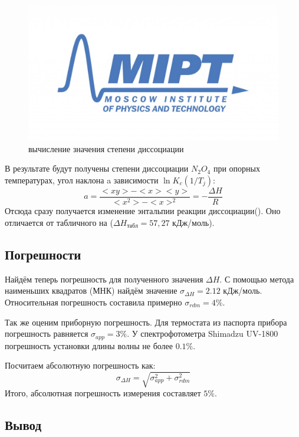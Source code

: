 \documentclass[a4paper,12pt]{article} %
\begin{document}
\begin{figure}[h!]
\begin{center}
\includegraphics[width=1.2\textwidth]{Images/logo.jpg}
\end{center}
\caption{вычисление значения степени диссоциации} \label{dz1}
\end{figure}


В результате будут получены степени диссоциации $N_2O_4$ при опорных температурах, угол наклона a зависимости $\ln K_c(1/T_j)$:
\begin{equation}
a = \frac{ <xy> - <x><y>}{<x^2> - <x>^2} = -\frac{\Delta H}{R}
\end{equation}
Отсюда сразу получается изменение энтальпии реакции диссоциации(). Оно отличается от табличного на ($\Delta H_{табл} = 57,27$ кДж/моль).

\subsection*{Погрешности}

Найдём теперь погрешность для полученного значения $\Delta H$.
С помощью метода наименьших квадратов (МНК) найдём значение $\sigma_{\Delta H} = 2.12$ кДж/моль. Относительная погрешность составила примерно $\sigma_{rdm} = 4 \%$.


Так же оценим приборную погрешность.
Для термостата из паспорта прибора погрешность равняется $\sigma_{app} = 3 \%$.
У спектрофотометра Shimadzu UV-1800 погрешность установки длины волны не более $0.1 \%$. 

Посчитаем абсолютную погрешность как:
\begin{equation}
\sigma_{\Delta H} = \sqrt{\sigma_{app}^2+\sigma_{rdm}^2}
\end{equation}
Итого, абсолютная погрешность измерения составляет $5 \%$.

\subsection*{Вывод}




  
\end{document}

